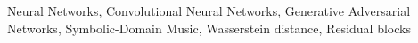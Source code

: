 \documentclass[10pt, conference, letterpaper]{IEEEtran}
\newcommand\MR[1]{\textcolor{blue}{#1}}
\newcommand\red[1]{\textcolor{red}{#1}}
\begin{document}
\begin{abstract}

\end{abstract}

\begin{IEEEkeywords}
Neural Networks, Convolutional Neural Networks, Generative Adversarial Networks, Symbolic-Domain Music, Wasserstein distance, Residual blocks
\end{IEEEkeywords}



















\end{document}
